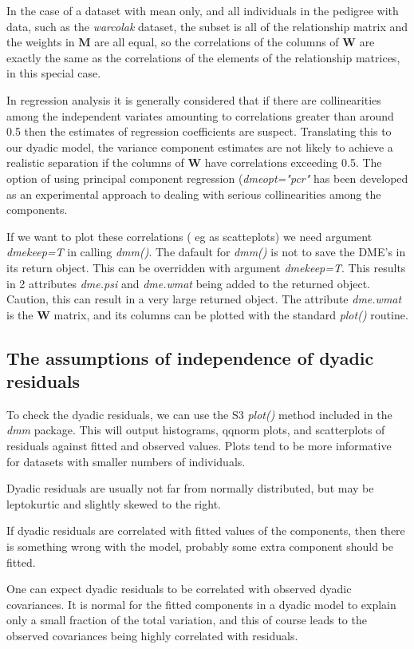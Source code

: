 \documentclass[titlepage,a4paper,12pt]{article}  %
\begin{document}
In the case of a dataset with mean only, and all individuals in the pedigree with data, such as the {\em warcolak} dataset, the subset is all of the relationship matrix and the weights in $\bm{M}$ are all equal, so the correlations of the columns of $\bm{W}$ are exactly the same as the correlations of the elements of the relationship matrices, in this special case.

In regression analysis it is generally considered that if there are collinearities among the independent variates amounting to correlations greater than around 0.5 then the estimates of regression coefficients are suspect. Translating this to our dyadic model, the variance component estimates are not likely to achieve a realistic separation if the columns of $\bm{W}$ have correlations exceeding 0.5. The option of using principal component regression ({\em dmeopt="pcr"} has been developed as an experimental approach to dealing with serious collinearities among the components.

If we want to plot these correlations ( eg as scatteplots) we need argument {\em dmekeep=T} in calling {\em dmm()}. The dafault for {\em dmm()} is not to save the DME's in its return object. This can be overridden with argument {\em dmekeep=T}. This results in 2 attributes {\em dme.psi} and {\em dme.wmat} being added to the returned object. Caution, this can result in a very large returned object. The attribute {\em dme.wmat} is the $\bm{W}$ matrix, and its columns can be plotted with the standard {\em plot()} routine.

\subsection{The assumptions of independence of dyadic residuals}
To check the dyadic residuals, we can use the S3 {\em plot()} method included in the {\em dmm} package. This will output histograms, qqnorm plots, and scatterplots of residuals against fitted and observed values. Plots tend to be more informative for datasets with smaller numbers of individuals.

Dyadic residuals are usually not far from normally distributed, but may be leptokurtic and slightly skewed to the right.

If dyadic residuals are correlated with fitted values of the components, then there is something wrong with the model, probably some extra component should be fitted. 

One can expect dyadic residuals to be correlated with observed dyadic covariances. It is normal for the fitted components in a dyadic model to explain only a small fraction of the total variation, and this of course leads to the observed covariances being highly correlated with residuals.
\end{document}

